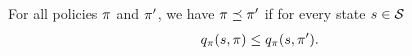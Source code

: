 \label{thm: policy improvement theorem}\begin{theorem}
For all policies $\pi$ and $\pi'$, we have $\pi \preceq \pi'$
if for every state $s \in \mathcal{S}$
\begin{align}
\label{eq: PIT if}
    q_\pi(s, \pi) \leq q_\pi(s, \pi') .
\end{align}

    
    
    
\end{theorem}
